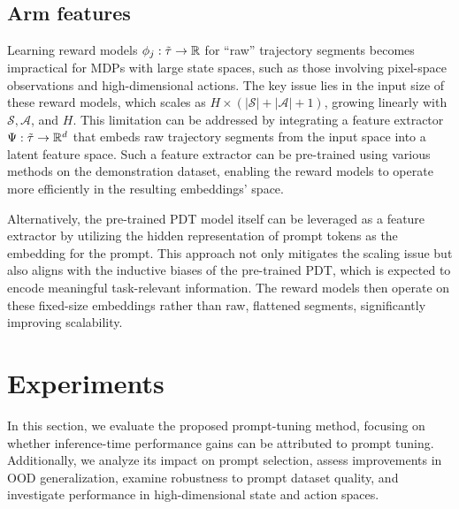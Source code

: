 \documentclass{article} %
\begin{document}
\subsection{Arm features}\label{sec:arm-features}
Learning reward models $\phi_j: \Tilde{\tau} \to \mathbb{R}$ for ``raw'' trajectory segments becomes impractical for MDPs with large state spaces, such as those involving pixel-space observations and high-dimensional actions. The key issue lies in the input size of these reward models, which scales as $H \times (|\mathcal{S}| + |\mathcal{A}| + 1)$, growing linearly with $\mathcal{S}, \mathcal{A}$, and $H$.
This limitation can be addressed by integrating a feature extractor $\Psi: {\Tilde{\tau}} \to \mathbb{R}^d$ that embeds raw trajectory segments from the input space into a latent feature space. Such a feature extractor can be pre-trained using various methods on the demonstration dataset, enabling the reward models to operate more efficiently in the resulting embeddings' space.

Alternatively, the pre-trained PDT model itself can be leveraged as a feature extractor by utilizing the hidden representation of prompt tokens as the embedding for the prompt. This approach not only mitigates the scaling issue but also aligns with the inductive biases of the pre-trained PDT, which is expected to encode meaningful task-relevant information. The reward models then operate on these fixed-size embeddings rather than raw, flattened segments, significantly improving scalability.



\section{Experiments}
\label{sec:experiments}

In this section, we evaluate the proposed prompt-tuning method, focusing on whether inference-time performance gains can be attributed to prompt tuning. Additionally, we analyze its impact on prompt selection, assess improvements in OOD generalization, examine robustness to prompt dataset quality, and investigate performance in high-dimensional state and action spaces.
\end{document}
